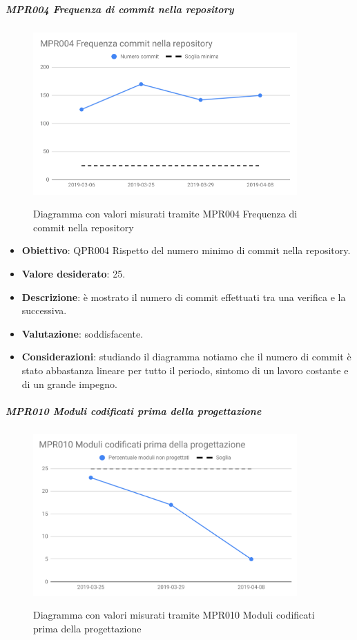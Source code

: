 	\subparagraph{MPR004 Frequenza di commit nella repository}

	\begin{figure}[H]
		\centering
		\includegraphics[width=0.9\textwidth]{img/cruscotti/RQ/MPR004.png}
		\label{immagineFrequenzaCommitRQ}
		\caption{Diagramma con valori misurati tramite MPR004 Frequenza di commit nella repository}
	\end{figure}

	\begin{itemize}
		\item \textbf{Obiettivo}: QPR004 Rispetto del numero minimo di commit nella repository.
		\item \textbf{Valore desiderato}: 25.
		\item \textbf{Descrizione}: è mostrato il numero di commit effettuati tra una verifica e la successiva.
		\item \textbf{Valutazione}: soddisfacente.
		\item \textbf{Considerazioni}: studiando il diagramma notiamo che il numero di commit è stato
		abbastanza lineare per tutto il periodo, sintomo di un lavoro costante e di un grande impegno.
	\end{itemize}

	\subparagraph{MPR010 Moduli codificati prima della progettazione}
	
	\begin{figure}[H]
		\centering
		\includegraphics[width=0.9\textwidth]{img/cruscotti/RQ/MPR010.png}
		\label{immagineFrequenzaCommitRQ}
		\caption{Diagramma con valori misurati tramite MPR010 Moduli codificati prima della progettazione}
	\end{figure}
	
